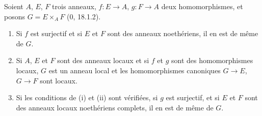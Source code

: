 \begin{lemma}[19.3.2.1]
\label{IV.19.3.2.1}
Soient $A$, $E$, $F$ trois anneaux, $f:E\to A$, $g:F\to A$ deux homomorphismes, et posons $G=E\times_A F$ ($0$, 18.1.2).
\begin{enumerate}
  \item[(i)] Si $f$ est surjectif et si $E$ et $F$ sont des anneaux noethériens, il en est de même de $G$.
  \item[(ii)] Si $A$, $E$ et $F$ sont des anneaux locaux et si $f$ et $g$ sont des homomorphismes locaux, $G$ est un anneau local et les homomorphismes canoniques $G\to E$, $G\to F$ sont locaux.
  \item[(iii)] Si les conditions de (i) et (ii) sont vérifiées, si $g$ est surjectif, et si $E$ et $F$ sont des anneaux locaux noethériens complets, il en est de même de $G$.
\end{enumerate}
\end{lemma}

